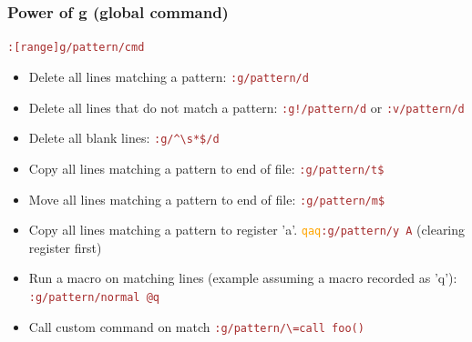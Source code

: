 \documentclass{beamer}
\newcommand{\vimnormal}[1]{\texttt{\textcolor{orange}{#1}}}
\newcommand{\vimcommand}[1]{\texttt{\textcolor{brown}{#1}}}
\begin{document}
\begin{frame}
  \frametitle{Power of g (global command)}
  \vimcommand{:[range]g/pattern/cmd}

  \begin{itemize}
    \item Delete all lines matching a pattern: \vimcommand{:g/pattern/d}
    \item Delete all lines that do not match a pattern: \vimcommand{:g!/pattern/d} or \vimcommand{:v/pattern/d}
    \item Delete all blank lines: \vimcommand{:g/\string^\textbackslash{s}*\$/d}
    \item Copy all lines matching a pattern to end of file: \vimcommand{:g/pattern/t\$}
    \item Move all lines matching a pattern to end of file: \vimcommand{:g/pattern/m\$}
    \item Copy all lines matching a pattern to register 'a'. \vimnormal{qaq}\vimcommand{:g/pattern/y A} (clearing register first)
    \item Run a macro on matching lines (example assuming a macro recorded as 'q'): \vimcommand{:g/pattern/normal @q}
    \item Call custom command on match \vimcommand{:g/pattern/\textbackslash{=}call foo()}
  \end{itemize}
\end{frame}
\end{document}

